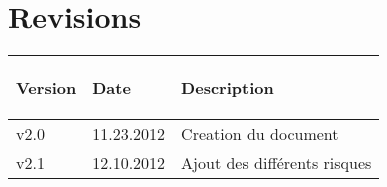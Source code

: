 \part*{Revisions}

%
%

\begin{tabular}{|p{2cm}|p{2cm}|p{6cm}|}
	\hline
		\rowcolor{table_header_color} 
		\begin{bf}Version\end{bf} & \begin{bf}Date\end{bf} & \begin{bf}Description\end{bf} \\
	\hline
		v2.0 & 11.23.2012 & Creation du document \\
	\hline	
		v2.1 & 12.10.2012 & Ajout des différents risques \\
	\hline	
\end{tabular}